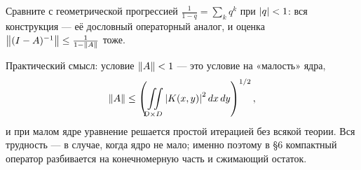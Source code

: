 \begin{idea}
Сравните с геометрической прогрессией $\frac{1}{1-q} = \sum_k q^k$ при
$\left\lvert q \right\rvert < 1$: вся конструкция — её дословный операторный аналог, и оценка
$\left\lVert (I-A)^{-1} \right\rVert \le \frac{1}{1-\left\lVert A \right\rVert}$ тоже.

\medskip
Практический смысл: условие $\left\lVert A \right\rVert < 1$ — это условие на «малость» ядра,
\[
  \left\lVert A \right\rVert \le \left(\iint\limits_{D\times D} \left\lvert K(x,y) \right\rvert^2 dx\,dy\right)^{1/2} ,
\]
и при малом ядре уравнение решается простой итерацией без всякой теории. Вся
трудность — в случае, когда ядро не мало; именно поэтому в \S6 компактный
оператор разбивается на конечномерную часть и сжимающий остаток.
\end{idea}

